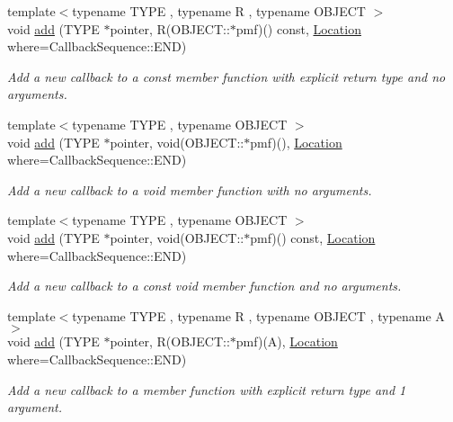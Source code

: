 \begin{DoxyCompactItemize}
{\footnotesize template$<$typename TYPE , typename R , typename OBJECT $>$ }\\void \hyperlink{struct_d_d4hep_1_1_callback_sequence_a75e9d2323c3ceffbedd940b089d9a279}{add} (TYPE $\ast$pointer, R(OBJECT::$\ast$pmf)() const, \hyperlink{struct_d_d4hep_1_1_callback_sequence_a7753490247479633aed16a2376821ef7}{Location} where=CallbackSequence::END)
\begin{DoxyCompactList}\small\item\em Add a new callback to a const member function with explicit return type and no arguments. \item\end{DoxyCompactList}\item 
{\footnotesize template$<$typename TYPE , typename OBJECT $>$ }\\void \hyperlink{struct_d_d4hep_1_1_callback_sequence_a032881e6a1d22611ffed927b6847a6be}{add} (TYPE $\ast$pointer, void(OBJECT::$\ast$pmf)(), \hyperlink{struct_d_d4hep_1_1_callback_sequence_a7753490247479633aed16a2376821ef7}{Location} where=CallbackSequence::END)
\begin{DoxyCompactList}\small\item\em Add a new callback to a void member function with no arguments. \item\end{DoxyCompactList}\item 
{\footnotesize template$<$typename TYPE , typename OBJECT $>$ }\\void \hyperlink{struct_d_d4hep_1_1_callback_sequence_a6924856939e0486f5afc0f7847c098cb}{add} (TYPE $\ast$pointer, void(OBJECT::$\ast$pmf)() const, \hyperlink{struct_d_d4hep_1_1_callback_sequence_a7753490247479633aed16a2376821ef7}{Location} where=CallbackSequence::END)
\begin{DoxyCompactList}\small\item\em Add a new callback to a const void member function and no arguments. \item\end{DoxyCompactList}\item 
{\footnotesize template$<$typename TYPE , typename R , typename OBJECT , typename A $>$ }\\void \hyperlink{struct_d_d4hep_1_1_callback_sequence_a1af126fe7c1fd9b2d7df9c4946b25507}{add} (TYPE $\ast$pointer, R(OBJECT::$\ast$pmf)(A), \hyperlink{struct_d_d4hep_1_1_callback_sequence_a7753490247479633aed16a2376821ef7}{Location} where=CallbackSequence::END)
\begin{DoxyCompactList}\small\item\em Add a new callback to a member function with explicit return type and 1 argument. \item\end{DoxyCompactList}\item 

\end{DoxyCompactItemize}
